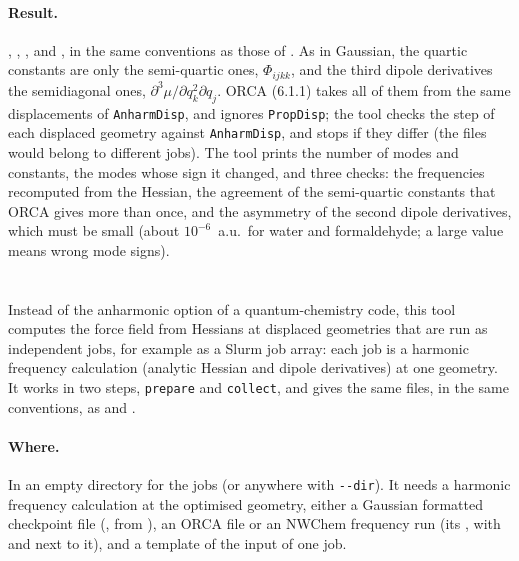 \paragraph{Result.} , , ,
 and , in the same conventions as those of
. As in Gaussian, the quartic constants are only the
semi-quartic ones, $\Phi_{ijkk}$, and the third dipole derivatives the
semidiagonal ones, $\partial^3\mu/\partial q_k^2\partial q_j$. ORCA
(6.1.1) takes all of them from the same displacements of
\texttt{AnharmDisp}, and ignores \texttt{PropDisp}; the tool checks the
step of each displaced geometry against \texttt{AnharmDisp}, and stops if
they differ (the files would belong to different jobs). The tool prints
the number of modes and constants, the modes whose sign it changed, and
three checks: the frequencies recomputed from the Hessian, the agreement
of the semi-quartic constants that ORCA gives more than once, and the
asymmetry of the second dipole derivatives, which must be small (about
$10^{-6}$~a.u.\ for water and formaldehyde; a large value means wrong mode
signs).

\section{}\label{sec:run-fd}

Instead of the anharmonic option of a quantum-chemistry code, this tool
computes the force field from Hessians at displaced geometries that are
run as independent jobs, for example as a Slurm job array: each job is a
harmonic frequency calculation (analytic Hessian and dipole derivatives)
at one geometry. It works in two steps, \texttt{prepare} and
\texttt{collect}, and gives the same files, in the same conventions, as
 and .

\paragraph{Where.} In an empty directory for the jobs (or anywhere with
\texttt{-{}-dir}). It needs a harmonic frequency calculation at the
optimised geometry, either a Gaussian formatted checkpoint file
(, from ), an ORCA  file or an
NWChem frequency run (its , with 
and  next to it), and a
template of the input of one job.

